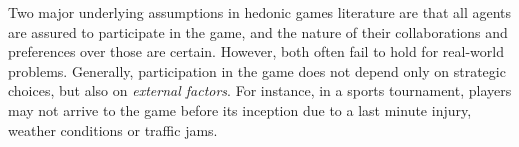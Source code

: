 \documentclass[letterpaper]{article}
\begin{document}
Two major underlying assumptions in hedonic games literature are that all agents are assured to participate in the game, and the nature of their collaborations and preferences over those are certain. However, both often fail to hold for real-world problems. Generally, participation in the game does not depend only on strategic choices, but also on \textit{external factors}. For instance, in a sports tournament, players may not arrive to the game before its inception due to a last minute injury, weather conditions or traffic jams. %
\end{document}
